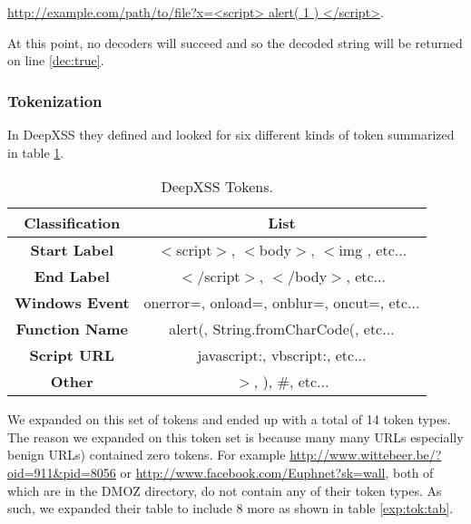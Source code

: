 \url{http://example.com/path/to/file?x=<script> alert( 1 ) </script>}. 

At this point, no decoders will succeed and so the decoded string will be returned on line \ref{dec:true}.


\subsubsection{Tokenization}
In DeepXSS they defined and looked for six different kinds of token summarized in table \ref{tok:tab}.

\begin{table}
\begin{center}
\begin{tabular}{||c | c||} 
    \hline
    Classification & List \\ [0.5ex] 
    \hline\hline
    \textbf{Start Label} &  $<$script$>$, $<$body$>$, $<$img , etc... \\ 
    \hline
    \textbf{End Label} & $</$script$>$, $</$body$>$, etc... \\
    \hline
    \textbf{Windows Event} & onerror=, onload=, onblur=, oncut=, etc... \\
    \hline
    \textbf{Function Name} & alert(, String.fromCharCode(, etc... \\
    \hline
    \textbf{Script URL} & javascript:, vbscript:, etc... \\ 
    \hline
    \textbf{Other} & $>$, ), \#, etc... \\ [1ex] 
    \hline
\end{tabular}
\caption{\label{tok:tab}DeepXSS Tokens.}
\end{center}
\end{table}

We expanded on this set of tokens and ended up with a total of 14 token types. The reason we expanded on this token set is because many many URLs especially benign URLs) contained zero tokens. For example \url{http://www.wittebeer.be/?oid=911\&pid=8056} or \url{http://www.facebook.com/Euphnet?sk=wall}, both of which are in the DMOZ directory, do not contain any of their token types. As such, we expanded their table to include 8 more as shown in table \ref{exp:tok:tab}.

